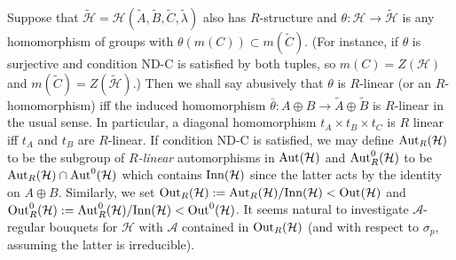 \documentclass[12pt]{article}
\newcommand{\addwords}[1]{\ \ \ \mbox{#1}}
\newcommand{\Aut}{{\rm Aut}}
\newcommand{\bbC}{\ensuremath{\mathbb{C}}}\newcommand{\bbCp}{\ensuremath{\mathbb{C}_p}}
\newcommand{\cA}{\ensuremath{\mathcal{A}}}
\newcommand{\cH}{\ensuremath{\mathcal{H}}}
\newcommand{\cM}{\mathcal{M}}
\newcommand{\Inn}{{\rm Inn}}
\newcommand{\inv}{^{-1}}%
\newcommand{\Out}{{\rm Out}}
\newcommand{\sep}{\ \\================================================== \\}
\renewcommand{\t}[1]{\tilde{#1}}
\newcommand{\Hei}[4]{\cH({#1},{#2},{#3},{#4})}
\begin{document}
Suppose that   
$\t \cH=\Hei{\t A}{\t B}{\t C}{\t \lambda}$ also has $R$-structure and  
$\theta:\cH\rightarrow\t \cH$ is any homomorphism of groups with 
$\theta(m(C))\subset m(\t C)$. (For instance, if $\theta$ is surjective and  condition ND-C is satisfied by both tuples, so $m(C)=Z(\cH)$ and $m(\t C)=Z(\t \cH)$.) 
Then we shall say abusively that $\theta$ is $R$-linear (or an $R$-homomorphism) iff the induced homomorphism 
$\bar \theta  :A\oplus B\rightarrow \t A\oplus \t B$ is $R$-linear in the usual sense. In particular,  
a diagonal homomorphism $t_A\times t_B\times t_C$ is $R$ linear iff $t_A$ and $t_B$ are $R$-linear. If condition ND-C is satisfied, we may  define $\Aut_R(\cH)$ to be the
subgroup of \textit{$R$-linear} automorphisms in $\Aut(\cH)$ and $\Aut^0_R(\cH)$ to be $\Aut_R(\cH)\cap\Aut^0(\cH)$ which contains $\Inn(\cH)$ since the latter acts by the identity on $A\oplus B$. Similarly, we set $\Out_R(\cH):=\Aut_R(\cH)/\Inn(\cH)<\Out(\cH)$ and $\Out_R^0(\cH):=\Aut_R^0(\cH)/\Inn(\cH)<\Out^0(\cH)$. It seems
 natural to investigate $\cA$-regular bouquets for $\cH$ with  $\cA$ contained in $\Out_R(\cH)$ (and with respect to $\sigma_p$, assuming the latter is irreducible).
\end{document}
